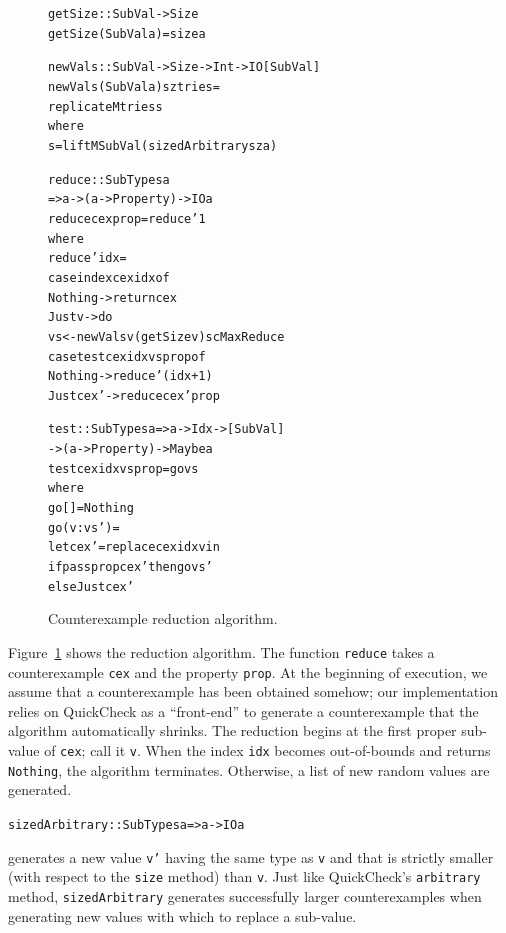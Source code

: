 \documentclass[10pt]{sigplanconf}
\newenvironment{code}{\begin{alltt}\small}{\end{alltt}}
\newcommand{\ttp}[1]{\texttt{#1}}
\begin{document}
\begin{figure}[ht]
  \begin{code}
getSize :: SubVal -> Size
getSize (SubVal a) = size a

newVals :: SubVal -> Size -> Int -> IO [SubVal]
newVals (SubVal a) sz tries =
  replicateM tries s
  where
  s  = liftM SubVal (sizedArbitrary sz a)

reduce :: SubTypes a
       => a -> (a -> Property) -> IO a
reduce cex prop = reduce' 1
  where
  reduce' idx =
    case index cex idx of
      Nothing -> return cex
      Just v  -> do
        vs <- newVals v (getSize v) scMaxReduce
        case test cex idx vs prop of
          Nothing   -> reduce' (idx+1)
          Just cex' -> reduce cex' prop

test :: SubTypes a => a -> Idx -> [SubVal]
     -> (a -> Property) -> Maybe a
test cex idx vs prop = go vs
  where
  go []      = Nothing
  go (v:vs') =
    let cex' = replace cex idx v in
    if pass prop cex' then go vs'
      else Just cex'
  \end{code}
  \caption{Counterexample reduction algorithm.\label{fig:reduction}}
\end{figure}

Figure~\ref{fig:reduction} shows the reduction algorithm.  The function
\ttp{reduce} takes a counterexample \ttp{cex} and the property \ttp{prop}.  At
the beginning of execution, we assume that a counterexample has been obtained
somehow; our implementation relies on QuickCheck as a ``front-end'' to generate
a counterexample that the algorithm automatically shrinks.  The reduction begins
at the first proper sub-value of \ttp{cex}; call it \ttp{v}.  When the index
\ttp{idx} becomes out-of-bounds and returns \ttp{Nothing}, the algorithm
terminates.  Otherwise, a list of new random values are generated.
%
\begin{code}
sizedArbitrary :: SubTypes a => a -> IO a
\end{code}
%
\noindent
generates a new value \ttp{v'} having the same type as \ttp{v} and that is
strictly smaller (with respect to the \ttp{size} method) than \ttp{v}.  Just
like QuickCheck's \ttp{arbitrary} method, \ttp{sizedArbitrary} generates
successfully larger counterexamples when generating new values with which to
replace a sub-value.

\end{document}
